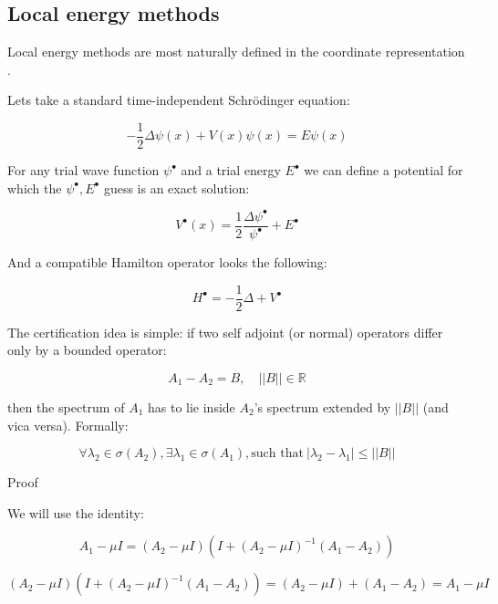 \documentclass{article}
\theoremstyle{definition}
\begin{document}
\subsection{Local energy methods}

Local energy methods are most naturally defined in the coordinate representation \cite{paper:GibaraHall2019,paper:Mouchet2005,book:Thirring1990}.

Lets take a standard time-independent Schrödinger equation:

\begin{equation}
    - \frac{1}{2} \Delta \psi(x) + V(x) \psi(x) = E \psi(x)
\end{equation}

For any trial wave function $\psi^\bullet$ and a trial energy $E^\bullet$ we can define a potential for which the $\psi^\bullet, E^\bullet$ guess is an exact solution:

\begin{equation}
    V^\bullet(x)= \frac{1}{2} \frac{\Delta \psi^\bullet}{\psi^\bullet} + E^\bullet
\end{equation}

And a compatible Hamilton operator looks the following:

\begin{equation}
    H^\bullet= - \frac{1}{2} \Delta + V^\bullet
\end{equation}

The certification idea is simple: if two self adjoint (or normal) operators differ only by a bounded operator:

\begin{equation}
    A_1-A_2 = B, \quad ||B|| \in \mathbb{R}
\end{equation}

then the spectrum of $A_1$ has to lie inside $A_2$'s spectrum extended by $||B||$ (and vica versa). Formally:

\begin{equation}
    \forall \lambda_2 \in \sigma(A_2), \exists \lambda_1 \in \sigma(A_1), \text{such that}
    \ |\lambda_2-\lambda_1| \le ||B||
\end{equation}

Proof

We will use the identity:

\begin{equation}
    A_1-\mu I
    =
    (A_2- \mu I)(I+(A_2-\mu I)^{-1}(A_1-A_2))
\end{equation}

\begin{equation}
    (A_2- \mu I)(I+(A_2-\mu I)^{-1}(A_1-A_2))
    =
    (A_2-\mu I)+(A_1-A_2)
    =
     A_1-\mu I
\end{equation}
\end{document}
